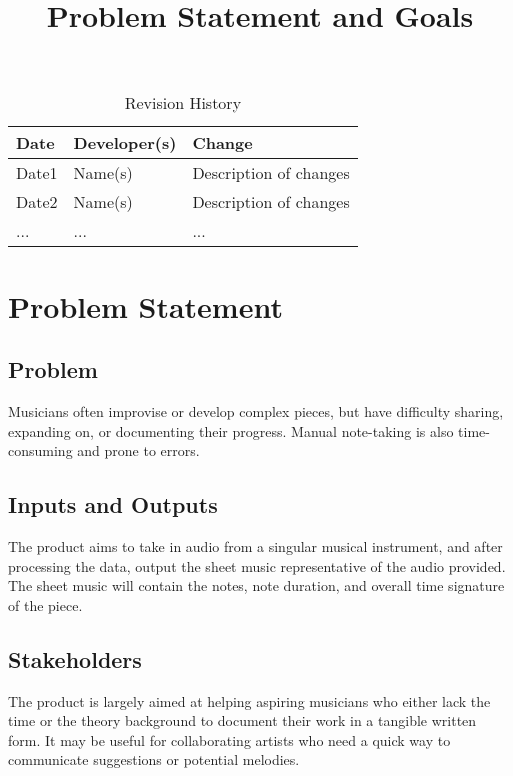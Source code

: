 \documentclass{article}
\title{Problem Statement and Goals\\\progname}
\author{\authname}
\date{}
\begin{document}
\maketitle

\begin{table}[hp]
\caption{Revision History} \label{TblRevisionHistory}
\begin{tabularx}{\textwidth}{llX}
\toprule
\textbf{Date} & \textbf{Developer(s)} & \textbf{Change}\\
\midrule
Date1 & Name(s) & Description of changes\\
Date2 & Name(s) & Description of changes\\
... & ... & ...\\
\bottomrule
\end{tabularx}
\end{table}

\section{Problem Statement}

\subsection{Problem}
Musicians often improvise or develop complex pieces, but have difficulty sharing, expanding on, or documenting their progress. Manual note-taking is also time-consuming and prone to errors.

\subsection{Inputs and Outputs}

The product aims to take in audio from a singular musical instrument, and after processing the data, output the sheet music representative of the audio provided. The sheet music will contain the notes, note duration, and overall time signature of the piece.


\subsection{Stakeholders}

The product is largely aimed at helping aspiring musicians who either lack the time or the theory background to document their work in a tangible written form. It may be useful for collaborating artists who need a quick way to communicate suggestions or potential melodies.
\end{document}
